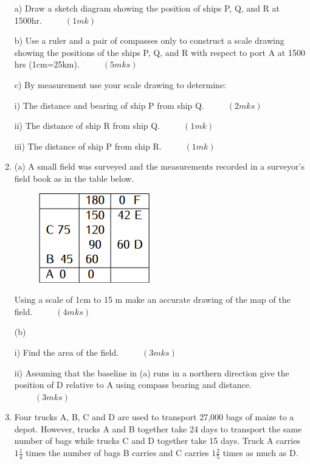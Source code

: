 \documentclass[
  a4paperpaper,
]{scrbook}
\begin{document}
\begin{tcolorbox}
\begin{enumerate}
  a) Draw a sketch diagram showing the position of ships P, Q, and R at
  1500hr. \(\hspace{1cm}(1mk)\)

  b) Use a ruler and a pair of compasses only to construct a scale
  drawing showing the positions of the ships P, Q, and R with respect to
  port A at 1500 hrs (1cm=25km). \(\hspace{1cm}(5mks)\)

  c) By measurement use your scale drawing to determine:

  i) The distance and bearing of ship P from ship Q.
  \(\hspace{1cm} (2mks)\)

  ii) The distance of ship R from ship Q. \(\hspace{1cm} (1mk)\)

  iii) The distance of ship P from ship R. \(\hspace{1cm} (1mk)\)
\item
  (a) A small field was surveyed and the measurements recorded in a
  surveyor's field book as in the table below.

  \begin{figure}

  {\centering \includegraphics{figures/Md6_Q19a.png}

  }

  \end{figure}

  Using a scale of 1cm to 15 m make an accurate drawing of the map of
  the field. \(\hspace{1cm} (4mks)\)

  (b)

  i) Find the area of the field. \(\hspace{1cm} (3mks)\)

  ii) Assuming that the baseline in (a) runs in a northern direction
  give the position of D relative to A using compass bearing and
  distance. \(\hspace{1cm} (3mks)\)
\item
  Four trucks A, B, C and D are used to transport 27,000 bags of maize
  to a depot. However, trucks A and B together take 24 days to transport
  the same number of bags while trucks C and D together take 15 days.
  Truck A carries \(1\frac{1}{4}\) times the number of bags B carries
  and C carries \(1\frac{2}{5}\) times as much as D.


\end{enumerate}
\end{tcolorbox}
\end{document}

